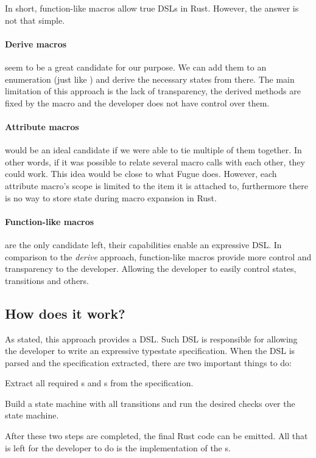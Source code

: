 In short, function-like macros allow true DSLs in Rust. However, the answer is not that simple.

\paragraph{Derive macros} seem to be a great candidate for our purpose.
We can add them to an enumeration (just like \autocite{Fitzgerald2019}) and derive the necessary states from there.
The main limitation of this approach is the lack of transparency,
the derived methods are fixed by the macro and the developer does not have control over them.

\paragraph{Attribute macros} would be an ideal candidate if we were able to tie multiple of them together.
In other words, if it was possible to relate several macro calls with each other, they could work.
This idea would be close to what Fugue \autocite{DeLine2004} does.
However, each attribute macro's scope is limited to the item it is attached to,
furthermore there is no way to store state during macro expansion in Rust.

\paragraph{Function-like macros} are the only candidate left, their capabilities enable an expressive DSL.
In comparison to the \emph{derive} approach, function-like macros provide more control and transparency to the developer.
Allowing the developer to easily control states, transitions and others.

\subsection{How does it work?}

As stated, this approach provides a DSL.
Such DSL is responsible for allowing the developer to write an expressive typestate specification.
When the DSL is parsed and the specification extracted, there are two important things to do:
\begin{compactenum}
    \item Extract all required s and s from the specification.
    \item Build a state machine with all transitions and run the desired checks over the state machine.
\end{compactenum}
After these two steps are completed, the final Rust code can be emitted.
All that is left for the developer to do is the implementation of the s.


